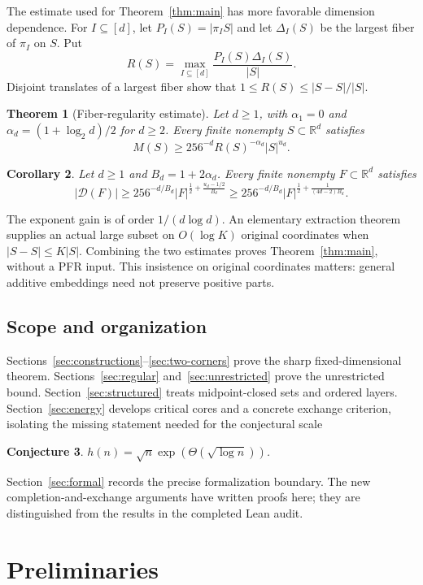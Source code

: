 \documentclass[11pt]{amsart}
\newtheorem{theorem}{Theorem}[section]
\newtheorem{corollary}[theorem]{Corollary}
\newtheorem{conjecture}[theorem]{Conjecture}
\theoremstyle{definition}
\theoremstyle{remark}
\newcommand{\R}{\mathbb{R}}
\newcommand{\Dp}{\mathcal{D}}
\begin{document}
The estimate used for Theorem~\ref{thm:main} has more favorable dimension dependence. For $I\subseteq[d]$, let $P_I(S)=|\pi_I S|$ and let $\Delta_I(S)$ be the largest fiber of $\pi_I$ on $S$. Put
\[
R(S)=\max_{I\subseteq[d]}\frac{P_I(S)\Delta_I(S)}{|S|}.
\]
Disjoint translates of a largest fiber show that $1\le R(S)\le|S-S|/|S|$.

\begin{theorem}[Fiber-regularity estimate]\label{thm:regular}
Let $d\ge1$, with $\alpha_1=0$ and $\alpha_d=(1+\log_2d)/2$ for $d\ge2$. Every finite nonempty $S\subset\R^d$ satisfies
\[
M(S)\ge256^{-d}R(S)^{-\alpha_d}|S|^{u_d}.
\]
\end{theorem}

\begin{corollary}\label{cor:uniform}
Let $d\ge1$ and $B_d=1+2\alpha_d$. Every finite nonempty $F\subset\R^d$ satisfies
\[
|\Dp(F)|\ge256^{-d/B_d}|F|^{\frac12+\frac{u_d-1/2}{B_d}}
\ge256^{-d/B_d}|F|^{\frac12+\frac1{(4d-2)B_d}}.
\]
\end{corollary}
The exponent gain is of order $1/(d\log d)$. An elementary extraction theorem supplies an actual large subset on $O(\log K)$ original coordinates when $|S-S|\le K|S|$. Combining the two estimates proves Theorem~\ref{thm:main}, without a PFR input. This insistence on original coordinates matters: general additive embeddings need not preserve positive parts.

\subsection*{Scope and organization}
Sections~\ref{sec:constructions}--\ref{sec:two-corners} prove the sharp fixed-dimensional theorem. Sections~\ref{sec:regular} and~\ref{sec:unrestricted} prove the unrestricted bound. Section~\ref{sec:structured} treats midpoint-closed sets and ordered layers. Section~\ref{sec:energy} develops critical cores and a concrete exchange criterion, isolating the missing statement needed for the conjectural scale
\begin{conjecture}\label{conj:main}
$h(n)=\sqrt n\exp(\Theta(\sqrt{\log n}))$.
\end{conjecture}
Section~\ref{sec:formal} records the precise formalization boundary. The new completion-and-exchange arguments have written proofs here; they are distinguished from the results in the completed Lean audit.

\section{Preliminaries}\label{sec:prelim}
\end{document}
